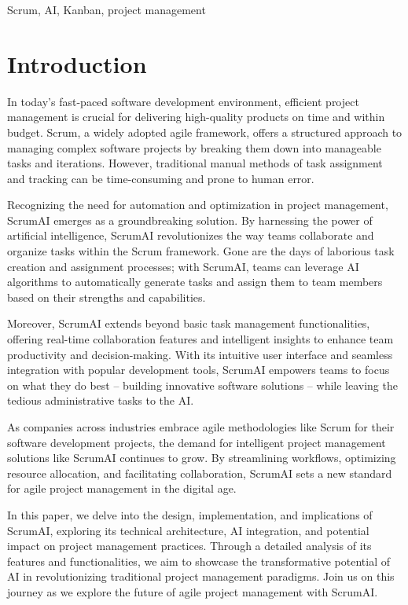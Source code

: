 \documentclass[conference]{IEEEtran}
\begin{document}
\begin{IEEEkeywords}
Scrum, AI, Kanban, project management
\end{IEEEkeywords}

\section{Introduction}

In today's fast-paced software development environment, efficient project management is crucial for delivering high-quality products on time and within budget. Scrum, a widely adopted agile framework, offers a structured approach to managing complex software projects by breaking them down into manageable tasks and iterations. However, traditional manual methods of task assignment and tracking can be time-consuming and prone to human error.

Recognizing the need for automation and optimization in project management, ScrumAI emerges as a groundbreaking solution. By harnessing the power of artificial intelligence, ScrumAI revolutionizes the way teams collaborate and organize tasks within the Scrum framework. Gone are the days of laborious task creation and assignment processes; with ScrumAI, teams can leverage AI algorithms to automatically generate tasks and assign them to team members based on their strengths and capabilities.

Moreover, ScrumAI extends beyond basic task management functionalities, offering real-time collaboration features and intelligent insights to enhance team productivity and decision-making. With its intuitive user interface and seamless integration with popular development tools, ScrumAI empowers teams to focus on what they do best – building innovative software solutions – while leaving the tedious administrative tasks to the AI.

As companies across industries embrace agile methodologies like Scrum for their software development projects, the demand for intelligent project management solutions like ScrumAI continues to grow. By streamlining workflows, optimizing resource allocation, and facilitating collaboration, ScrumAI sets a new standard for agile project management in the digital age.

In this paper, we delve into the design, implementation, and implications of ScrumAI, exploring its technical architecture, AI integration, and potential impact on project management practices. Through a detailed analysis of its features and functionalities, we aim to showcase the transformative potential of AI in revolutionizing traditional project management paradigms. Join us on this journey as we explore the future of agile project management with ScrumAI.
\end{document}
